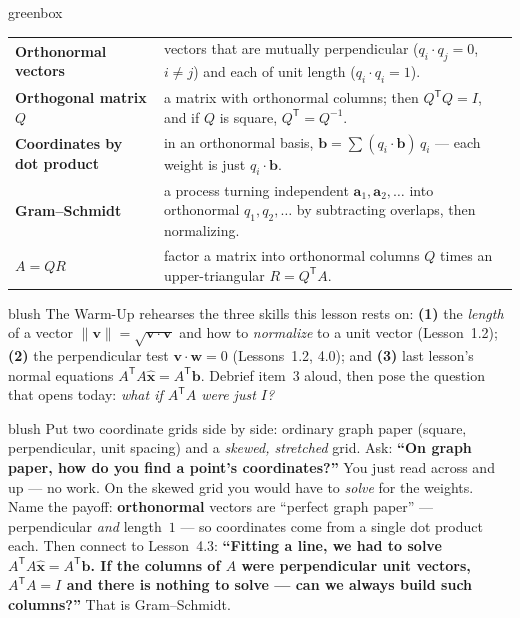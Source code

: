 \documentclass[10pt]{article}
\newcommand{\vv}{\mathbf{v}}
\newcommand{\ww}{\mathbf{w}}
\newcommand{\xx}{\mathbf{x}}
\newcommand{\bb}{\mathbf{b}}
\newcommand{\avec}{\mathbf{a}}
\newcommand{\T}{\mathsf{T}}
\begin{document}
\begin{skillbox}{greenbox}
\renewcommand{\arraystretch}{1.3}
\begin{tabularx}{\linewidth}{@{}l X@{}}
\textbf{Orthonormal vectors} & vectors that are mutually perpendicular ($q_i\cdot q_j=0$, $i\ne j$) and each of unit length ($q_i\cdot q_i=1$). \\
\textbf{Orthogonal matrix $Q$} & a matrix with orthonormal columns; then $Q^{\T}Q=I$, and if $Q$ is square, $Q^{\T}=Q^{-1}$. \\
\textbf{Coordinates by dot product} & in an orthonormal basis, $\bb=\sum(q_i\cdot\bb)\,q_i$ --- each weight is just $q_i\cdot\bb$. \\
\textbf{Gram--Schmidt} & a process turning independent $\avec_1,\avec_2,\dots$ into orthonormal $q_1,q_2,\dots$ by subtracting overlaps, then normalizing. \\
\textbf{$A=QR$} & factor a matrix into orthonormal columns $Q$ times an upper-triangular $R=Q^{\T}A$. \\
\end{tabularx}
\end{skillbox}

\begin{fixedskillbox}{blush}
    The Warm-Up rehearses the three skills this lesson rests on:
    \textbf{(1)} the \emph{length} of a vector $\|\vv\|=\sqrt{\vv\cdot\vv}$ and how to \emph{normalize} to a
    unit vector (Lesson~1.2); \textbf{(2)} the perpendicular test $\vv\cdot\ww=0$ (Lessons~1.2, 4.0); and
    \textbf{(3)} last lesson's normal equations $A^{\T}A\hat{\xx}=A^{\T}\bb$. Debrief item~3 aloud, then
    pose the question that opens today: \emph{what if $A^{\T}A$ were just $I$?}
\end{fixedskillbox}

\begin{skillbox}[Hook]{blush}
    Put two coordinate grids side by side: ordinary graph paper (square, perpendicular, unit spacing) and a
    \emph{skewed, stretched} grid. Ask: \textbf{``On graph paper, how do you find a point's coordinates?''}
    You just read across and up --- no work. On the skewed grid you would have to \emph{solve} for the
    weights. Name the payoff: \textbf{orthonormal} vectors are ``perfect graph paper'' --- perpendicular
    \emph{and} length~$1$ --- so coordinates come from a single dot product each. Then connect to Lesson~4.3:
    \textbf{``Fitting a line, we had to solve $A^{\T}A\hat{\xx}=A^{\T}\bb$. If the columns of $A$ were
    perpendicular unit vectors, $A^{\T}A=I$ and there is nothing to solve --- can we always build such
    columns?''} That is Gram--Schmidt.
\end{skillbox}
\end{document}
